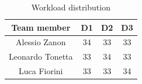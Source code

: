 \begin{table}[h]
\centering
\caption{Workload distribution}
\label{tab:workload}

\begin{tabular}{c|c c c}
\hline
\textbf{Team member} & \textbf{D1} & \textbf{D2} & \textbf{D3}\\
\hline
Alessio Zanon & 34 & 33 & 33\\
\hline
Leonardo Tonetta & 33 & 34 & 33\\
\hline
Luca Fiorini & 33 & 33 & 34\\
\hline
\end{tabular}

\end{table}
